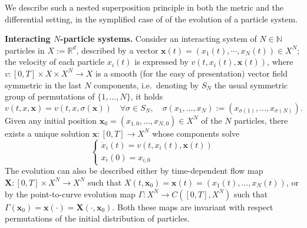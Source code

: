 \documentclass[10pt,leqno]{amsart}
\numberwithin{equation}{section}
\newcommand{\R}{\mathbb{R}}
\newcommand{\N}{\mathbb{N}}
\newcommand{\PP}{\mathcal{P}}
\begin{document}

We describe such a nested superposition principle in both the metric and the differential setting, in the symplified case of 
of the evolution of 
a particle system.


\newcommand{\myX}{X}
\newcommand{\pmyX}{X}
\bigskip
\noindent
\textbf{Interacting $N$-particle systems.} Consider an interacting system of $N\in \N$ particles in 
$\myX:=\R^d$, described by a vector $\boldsymbol x(t)=(x_1(t),\cdots,x_N(t))\in \pmyX^N$;
the velocity of each particle $x_i(t)$ is expressed by $v(t,x_i(t),\boldsymbol x(t))$, where
$v:[0,T]\times \myX \times \pmyX^N \to \myX$ is a smooth (for the easy of presentation) vector field symmetric in the last $N$ components, i.e.~denoting by $S_N$ the usual symmetric group of permutations of $\{1, \dots,N \}$, it holds
\[v(t,x,\boldsymbol{x}) = v(t,x,\sigma(\boldsymbol{x})) \quad \forall \sigma\in S_N, \quad \sigma(x_1,\dots,x_N) := (x_{\sigma(1)},\dots,x_{\sigma(N)}).\]
Given any initial position $\boldsymbol x_{0} = (x_{1,0},\dots,x_{N,0})\in \pmyX^N$
of the $N$ particles, there exists a unique solution $\boldsymbol x:[0,T]\to \pmyX^N$ 
whose components solve
\begin{equation}\label{int part system intro}
\begin{cases}
    \dot{x}_i(t) = v(t,x_i(t),\boldsymbol x(t))
    \\
    x_i(0) = x_{i,0}
\end{cases}
\end{equation}
The evolution can also be described either by time-dependent flow map 
 $\boldsymbol X:[0,T]\times \pmyX^N \to \pmyX^N$ such that $X(t,\boldsymbol x_0) = \boldsymbol x(t)=(x_1(t),\dots,x_N(t))$, or by the point-to-curve
evolution map $\Gamma:\pmyX^N \to 
C([0,T],\pmyX^N)$ such that $\Gamma(\boldsymbol{x}_0) = \boldsymbol{x}(\cdot)
=\boldsymbol X(\cdot,\boldsymbol x_0)$. Both these maps are invariant with respect permutations of the initial distribution of particles. 
\end{document}
